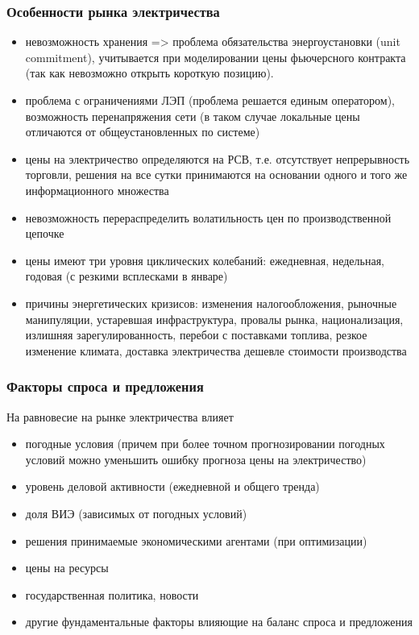 \documentclass[c, dvipsnames]{beamer}  %
\begin{document}
\begin{frame}[shrink=5]
\frametitle{Особенности рынка электричества} 

\begin{itemize}
\item невозможность хранения => проблема обязательства энергоустановки (unit commitment), учитывается при моделировании цены фьючерсного контракта (так как невозможно открыть короткую позицию). 
\item проблема с ограничениями ЛЭП (проблема решается единым оператором), возможность перенапряжения сети (в таком случае локальные цены отличаются от общеустановленных по системе) 
\item цены на электричество определяются на РСВ, т.е. отсутствует непрерывность торговли, решения на все сутки принимаются на основании одного и того же информационного множества
\item невозможность перераспределить волатильность цен по производственной цепочке 
\item  цены имеют три уровня циклических колебаний: ежедневная, недельная, годовая (с резкими всплесками в январе)
\item причины энергетических кризисов: изменения налогообложения, рыночные манипуляции, устаревшая инфраструктура, провалы рынка, национализация, излишняя зарегулированность, перебои с поставками топлива, резкое изменение климата,  доставка электричества дешевле стоимости производства 

\end{itemize}


\end{frame}




\begin{frame}[shrink=5]
\frametitle{Факторы спроса и предложения} 

На равновесие на рынке  электричества влияет 

\begin{itemize}
	\item  погодные условия (причем при более точном прогнозировании погодных условий можно уменьшить ошибку прогноза цены на электричество)
	\item  уровень  деловой активности  (ежедневной и общего тренда)
	\item  доля ВИЭ (зависимых от погодных условий) 
	\item  решения принимаемые  экономическими агентами (при оптимизации)
	\item  цены на ресурсы
	\item  государственная политика, новости
	\item  другие фундаментальные факторы влияющие на баланс спроса и предложения
\end{itemize}

\end{frame}
\end{document}
